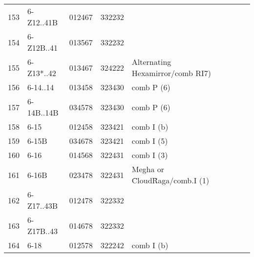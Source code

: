 \begin{table}[h]
\begin{tabular}{lllll}
153                    & 6-Z12..41B          & 012467  & 332232    &                                                            &                             &                   &      &     \\
154                    & 6-Z12B..41          & 013567  & 332232    &                                                            &                             &                   &      &     \\
155                    & 6-Z13*..42          & 013467  & 324222    & Alternating Hexamirror/comb RI7)                           &                             &                   &      &     \\
156                    & 6-14..14            & 013458  & 323430    & comb P (6)                                                 &                             &                   &      &     \\
157                    & 6-14B..14B          & 034578  & 323430    & comb P (6)                                                 &                             &                   &      &     \\
158                    & 6-15                & 012458  & 323421    & comb I (b)                                                 &                             &                   &      &     \\
159                    & 6-15B               & 034678  & 323421    & comb I (5)                                                 &                             &                   &      &     \\
160                    & 6-16                & 014568  & 322431    & comb I (3)                                                 &                             &                   &      &     \\
161                    & 6-16B               & 023478  & 322431    & Megha or \"Cloud\" Raga/comb.I (1)                         &                             &                   &      &     \\
162                    & 6-Z17..43B          & 012478  & 322332    &                                                            &                             &                   &      &     \\
163                    & 6-Z17B..43          & 014678  & 322332    &                                                            &                             &                   &      &     \\
164                    & 6-18                & 012578  & 322242    & comb I (b)                                                 &                             &                   &      &     \\

\end{tabular}
\end{table}

